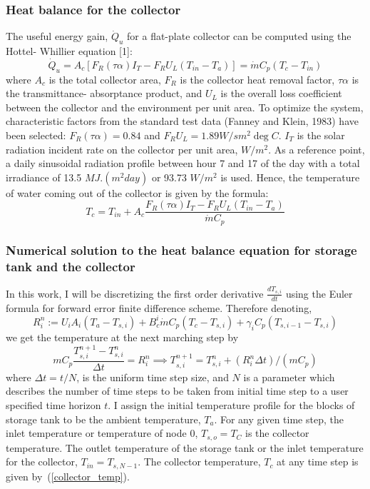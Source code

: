 \documentclass{article}
\begin{document}
\subsubsection*{Heat balance for the collector}
The useful energy gain, $\dot{Q}_u$ for a flat-plate collector can be computed using the Hottel- Whillier equation [1]:
\begin{equation}
\dot{Q}_u = A_c [F_R (\tau \alpha) I_T- F_R U_L (T_{in} - T_a)] =  \dot{m} C_p (T_c - T_{in})
\end{equation}
where $A_c$ is the total collector area, $F_R$ is the collector heat removal factor, $\tau \alpha$ is the transmittance- absorptance product, and $U_L$ is the overall loss coefficient between the collector and the environment per unit area. To optimize the system, characteristic factors from the standard test data (Fanney and Klein, 1983) have been selected:
$F_R (\tau \alpha) = 0.84$ and $F_R U_L = 1.89 W / s m^2 \deg  C$. $I_T$ is the solar radiation incident rate on the collector per unit area, $W /m^2$. As a reference point, a daily sinusoidal radiation profile between hour 7 and 17 of the day with a total irradiance of 13.5 $MJ . (m^2 day)$ or 93.73 $W/m^2$ is used.
Hence, the temperature of water coming out of the collector is given by the formula:
\begin{equation}\label{collector_temp}
T_c = T_{in} + A_c \frac{F_R (\tau \alpha)  I_T - F_R U_L (T_{in} - T_a)} { \dot{m} C_p}
\end{equation}


\subsubsection*{Numerical solution to the heat balance equation for storage tank and the collector}
In this work, I will be discretizing the first order derivative $\frac {dT_{s,i}} {dt} $ using the Euler formula for forward error finite difference scheme. Therefore denoting,
\begin{equation*}
R_i^n := U_i A_i (T_a - T_{s,i}) + B_c^i \dot{m} C_p (T_c - T_{s,i}) + \gamma_i C_p (T_{s, i-1} - T_{s,i})
\end{equation*}
we get the temperature at the next marching step by
\begin{equation}
m C_p \frac {T_{s,i}^{n+1} - T_{s,i}^n} {\Delta t} = R_i^n \implies T_{s,i}^{n+1} =  T_{s,i}^n + (R_i^n \Delta t) / (m C_p)
\end{equation}
where $\Delta t = t / N$, is the uniform time step size, and $N$ is a parameter which describes the number of time steps to be taken from initial time step to a user specified time horizon $t$. I assign the initial temperature profile for the blocks of storage tank to be the ambient temperature, $T_a$.  For any given time step, the inlet temperature or temperature of node $0$, $T_{s, o} = T_C$ is the collector temperature. The outlet temperature of the storage tank or the inlet temperature for the collector, $T_{in} = T_{s, N-1}$. The collector temperature, $T_c$ at any time step is given by~(\ref{collector_temp}).
\end{document}
